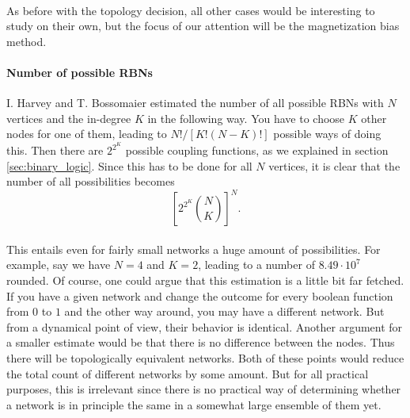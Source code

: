 \paragraph*{}
As before with the topology decision, all other cases would be interesting to study on their own, but the focus of our attention will be the magnetization bias method.

\paragraph*{Number of possible RBNs}
I. Harvey and T. Bossomaier \cite{harvey1997time} estimated the number of all possible RBNs with $N$ vertices and the in-degree $ K $ in the following way. You have to choose $ K $ other nodes for one of them, leading to $ N!/\left[K!(N-K)!\right]  $ possible ways of doing this. Then there are $ 2^{2^K} $ possible coupling functions, as we explained in section \ref{sec:binary_logic}. Since this has to be done for all $ N $ vertices, it is clear that the number of all possibilities becomes 
\begin{equation}
\left[2^{2^K}{N\choose K}\right]^N .
\end{equation}

\paragraph*{}
This entails even for fairly small networks a huge amount of possibilities. For example, say we have $N = 4$ and $K = 2$, leading to a number of $8.49\cdot 10^7$ rounded. Of course, one could argue that this estimation is a little bit far fetched. If you have a given network and change the outcome for every boolean function from $0$ to $1$ and the other way around, you may have a different network. But from a dynamical point of view, their behavior is identical. Another argument for a smaller estimate would be that there is no difference between the nodes. Thus there will be topologically equivalent networks. Both of these points would reduce the total count of different networks by some amount. But for all practical purposes, this is irrelevant since there is no practical way of determining whether a network is in principle the same in a somewhat large ensemble of them yet.

